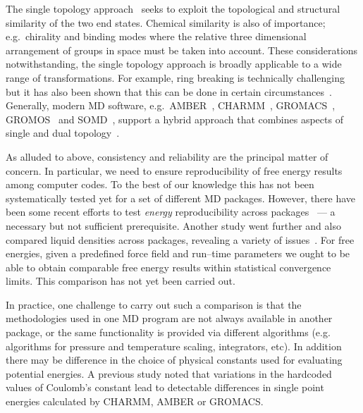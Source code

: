 \documentclass[journal=jctcce,manuscript=article]{achemso}
\begin{document}
%
The single topology approach~\cite{doi:10.1021/j100056a020} seeks to exploit the
topological and structural similarity of the two end states.
Chemical similarity is also of 
importance; e.g.\ chirality and binding modes where the relative three 
dimensional arrangement of groups in space must be taken into account.  
These considerations notwithstanding, the single topology approach is broadly applicable to a wide range of transformations.
For example, ring breaking is technically 
challenging~\cite{doi:10.1021/acs.jctc.6b00991} but it has also been
shown that this can be done in certain 
circumstances~\cite{doi:10.1021/acs.jcim.5b00057,
  doi:10.1021/jp994193s}.
Generally, modern MD software, e.g.\ AMBER~\cite{case_amber_2005},
CHARMM~\cite{JCC:JCC21287}, GROMACS~\cite{Abraham201519},
GROMOS~\cite{doi:10.1021/jp984217f} and SOMD~\cite{Sire-2016,
  doi:10.1021/ct300857j}, support a hybrid approach that combines aspects of single and dual topology~\cite{doi:10.1021/jp994193s}.


As alluded to above, consistency and reliability are the principal matter of concern.  
In particular, we need to ensure reproducibility of free energy results
among computer codes.  To the best of our knowledge this has not been
systematically tested yet for a set of different MD packages. 
However, there have been some recent efforts to test \emph{energy} 
reproducibility across packages~\cite{Shirts2017} --- a necessary but not 
sufficient prerequisite.  Another study went further and also compared liquid
densities across packages, revealing a variety of 
issues~\cite{doi:10.1021/acs.jctc.7b00489}.
For free energies, given a predefined force field and run--time parameters we 
ought to be able to obtain comparable free energy results within statistical 
convergence limits. This comparison has not yet been carried out.

In practice, one challenge to carry out such a comparison is that the methodologies
used in one MD program are not always available in another
package, or the same functionality is provided via different algorithms (e.g. algorithms for pressure and temperature 
scaling, integrators, etc).  In addition there may be difference in the  choice of physical constants used for evaluating potential energies. A previous study noted that variations in the hardcoded values of Coulomb's constant lead to detectable differences in single point energies calculated by CHARMM, AMBER or GROMACS.\cite{Shirts2017,SOMDcoulomb}  
\end{document}
